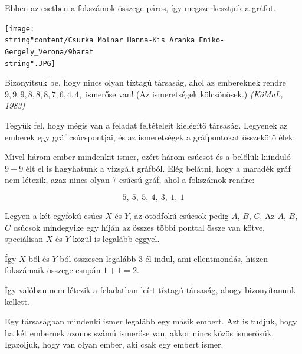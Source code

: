 \begin{solution}
Ebben az esetben a fokszámok összege páros, így megszerkesztjük a
gráfot.

\texttt{[image: \\string"content/Csurka\_Molnar\_Hanna-Kis\_Aranka\_Eniko-Gergely\_Verona/9barat\\string".JPG]}
\end{solution}
\begin{extraproblem}
Bizonyítsuk be, hogy nincs olyan tíztagú társaság, ahol az embereknek
rendre $9,9,9,8,8,8,7,6,4,4,$ ismerőse van! (Az ismeretségek kölcsönösek.)
\emph{(KöMaL, 1983) }
\end{extraproblem}

\begin{solution}
Tegyük fel, hogy mégis van a feladat feltételeit kielégítő társaság.
Legyenek az emberek egy gráf csúcspontjai, és az ismeretségek a gráfpontokat
összekötő élek.

Mivel három ember mindenkit ismer, ezért három csúcsot és a belőlük
kiinduló $9-9$ élt el is hagyhatunk a vizsgált gráfból. Elég belátni,
hogy a maradék gráf nem létezik, azaz nincs olyan 7 csúcsú gráf, ahol
a fokszámok rendre:

\[
5,\ 5,\ 5,\ 4,\ 3,\ 1,\ 1
\]

Legyen a két egyfokú csúcs $X$ és $Y$, az ötödfokú csúcsok pedig
$A$, $B$, $C$. Az $A$, $B$, $C$ csúcsok mindegyike egy híján
az összes többi ponttal össze van kötve, speciálisan $X$ és $Y$
közül is legalább eggyel.

Így $X$-ből és $Y$-ból összesen legalább 3 él indul, ami ellentmondás,
hiszen fokszámaik összege csupán $1+1=2$.

Így valóban nem létezik a feladatban leírt tíztagú társaság, ahogy
bizonyítanunk kellett. 
\end{solution}
\begin{extraproblem}
Egy társaságban mindenki ismer legalább egy másik embert. Azt is
tudjuk, hogy ha két embernek azonos számú ismerőse van, akkor nincs
közös ismerősük. Igazoljuk, hogy van olyan ember, aki csak egy embert
ismer. 
\end{extraproblem}

